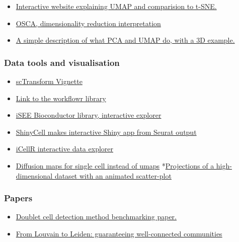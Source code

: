 \documentclass[
]{book}
\providecommand{\tightlist}{%
  \setlength{\itemsep}{0pt}\setlength{\parskip}{0pt}}
\begin{document}
\begin{itemize}
\tightlist
\item
  \href{https://pair-code.github.io/understanding-umap/}{Interactive website explaining UMAP and comparision to t-SNE.}
\item
  \href{http://bioconductor.org/books/3.14/OSCA.basic/dimensionality-reduction.html\#visualization-interpretation}{OSCA, dimensionality reduction interpretation}
\item
  \href{https://logarithmic.net/2023/dimred.html}{A simple description of what PCA and UMAP do, with a 3D example.}
\end{itemize}

\hypertarget{data-tools-and-visualisation}{%
\subsubsection{Data tools and visualisation}\label{data-tools-and-visualisation}}

\begin{itemize}
\tightlist
\item
  \href{https://satijalab.org/seurat/articles/sctransform_vignette.html}{scTransform Vignette}
\item
  \href{https://github.com/jdblischak/workflowr}{Link to the workflowr library}
\item
  \href{https://bioconductor.org/packages/release/bioc/html/iSEE.html}{iSEE Bioconductor library, interactive explorer}
\item
  \href{https://github.com/SGDDNB/ShinyCell}{ShinyCell makes interactive Shiny app from Seurat output}
\item
  \href{https://github.com/rezakj/iCellR}{iCellR interactive data explorer}
\item
  \href{https://www.helmholtz-munich.de/icb/research/groups/marr-lab/software/destiny/index.html}{Diffusion maps for single cell instead of umaps}
  *\href{https://logarithmic.net/langevitour/}{Projections of a high-dimensional dataset with an animated scatter-plot}
\end{itemize}

\hypertarget{papers}{%
\subsubsection{Papers}\label{papers}}

\begin{itemize}
\tightlist
\item
  \href{https://www.cell.com/cell-systems/fulltext/S2405-4712(20)30459-2}{Doublet cell detection method benchmarking paper.}
\item
  \href{https://www.nature.com/articles/s41598-019-41695-z}{From Louvain to Leiden: guaranteeing well-connected communities}
\end{itemize}
\end{document}
